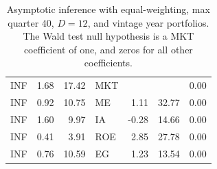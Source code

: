 \documentclass[12pt]{article}
\begin{document}
\begin{table}[ht]
\begin{tabular}{lrrlrrr}
		\hline
		INF & 1.68 & 17.42 & MKT &  &  & 0.00 \\ 
		INF & 0.92 & 10.75 & ME & 1.11 & 32.77 & 0.00 \\ 
		INF & 1.60 & 9.97 & IA & -0.28 & 14.66 & 0.00 \\ 
		INF & 0.41 & 3.91 & ROE & 2.85 & 27.78 & 0.00 \\ 
		INF & 0.76 & 10.59 & EG & 1.23 & 13.54 & 0.00 \\ 
		\hline
		\hline
	\end{tabular}
	\caption{Asymptotic inference with equal-weighting, max quarter 40, $D=12$, and vintage year portfolios. The Wald test null hypothesis is a MKT coefficient of one, and zeros for all other coefficients.}
	\label{tab:ai_40_ew_dep_vyp}
\end{table}

\end{document}
